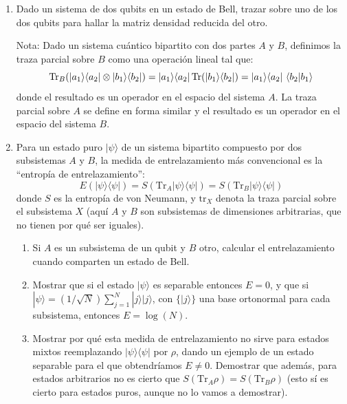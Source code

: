 \documentclass[a4paper,11pt,spanish]{article}
\newcommand{\ket}[1]{|#1\rangle}
\newcommand{\bra}[1]{\langle #1|}
\newcommand{\braket}[2]{\langle #1|#2\rangle}
\newcommand{\ketbra}[2]{\ket{#1}\bra{#2}}
\newcommand{\proj}[1]{\ketbra {#1}{#1}}
\begin{document}
\begin{enumerate}
\item Dado un sistema de dos qubits en un estado de Bell, trazar sobre uno de los dos qubits para hallar la matriz densidad reducida del otro.

Nota: Dado un sistema cu\'antico bipartito con dos partes $A$ y $B$, definimos la traza parcial sobre $B$ como una operaci\'on lineal tal que:
  $${\rm Tr}_B(\ketbra{a_1}{a_2}\otimes\ketbra{b_1}{b_2})=\ketbra{a_1}{a_2} \,{\rm Tr}(\ketbra{b_1}{b_2}) = \ketbra{a_1}{a_2} \,\, \braket{b_2}{b_1}$$
  donde el resultado es un operador en el espacio del sistema $A$. La traza parcial sobre $A$ se define en forma similar y el resultado es un operador en el espacio del sistema $B$.


\item Para un estado puro $|\psi\rangle$ de un sistema bipartito compuesto por dos subsistemas $A$ y $B$, la medida de entrelazamiento más convencional es la ``entropía de entrelazamiento'':
\begin{equation*}
    E(|\psi\rangle\langle \psi|)= S(\mbox{Tr}_A
    |\psi\rangle\langle\psi|) = S(\mbox{Tr}_B
    |\psi\rangle\langle\psi|)
\end{equation*}
donde $S$ es la entropía de von Neumann, y $\mbox{tr}_X$ denota la traza parcial sobre el subsistema $X$ (aquí $A$ y $B$ son subsistemas de dimensiones arbitrarias, que no tienen por qué ser iguales). 

\begin{enumerate}
\item Si $A$ es un subsistema de un qubit y $B$ otro, calcular el entrelazamiento cuando comparten un estado de Bell.
\item Mostrar que si el estado $|\psi\rangle$ es separable entonces $E=0$, y que si $\ket{\psi}=(1/\sqrt{N})\sum_{j=1}^N \ket{j}\ket{j}$, con $\{\ket{j}\}$ una base ortonormal para cada subsistema, entonces $E=\log(N)$.
\item Mostrar por qué esta medida de entrelazamiento no sirve para estados mixtos reemplazando $\proj{\psi}$ por $\rho$, dando un ejemplo de un estado separable para el que obtendríamos $E\neq0$. Demostrar que además, para estados arbitrarios no es cierto que $S(\mbox{Tr}_A \rho) = S(\mbox{Tr}_B \rho)$ (esto s\'i es cierto para estados puros, aunque no lo vamos a demostrar).
\end{enumerate}

\end{enumerate}
\end{document}

